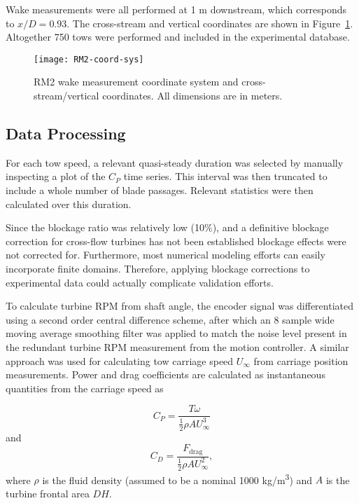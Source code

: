 Wake measurements were all performed at 1 m downstream, which corresponds to
$x/D = 0.93$. The cross-stream and vertical coordinates are shown in
Figure~\ref{fig:coordinates}. Altogether 750 tows were performed and included in
the experimental database.

\begin{figure}
    \centering

    \texttt{[image: RM2-coord-sys]}
    
    \caption{RM2 wake measurement coordinate system and cross-stream/vertical
        coordinates. All dimensions are in meters.}
    
    \label{fig:coordinates}
\end{figure}


\subsection{Data Processing}

For each tow speed, a relevant quasi-steady duration was selected by manually
inspecting a plot of the $C_P$ time series. This interval was then truncated to
include a whole number of blade passages. Relevant statistics were then
calculated over this duration.

Since the blockage ratio was relatively low (10\%), and a definitive blockage
correction for cross-flow turbines has not been established \cite{Cavagnaro2014}
blockage effects were not corrected for. Furthermore, most numerical modeling
efforts can easily incorporate finite domains. Therefore, applying blockage
corrections to experimental data could actually complicate validation efforts.

To calculate turbine RPM from shaft angle, the encoder signal was differentiated
using a second order central difference scheme, after which an 8 sample wide
moving average smoothing filter was applied to match the noise level present in
the redundant turbine RPM measurement from the motion controller. A similar
approach was used for calculating tow carriage speed $U_\infty$ from carriage
position measurements. Power and drag coefficients are calculated as
instantaneous quantities from the carriage speed as

\begin{equation}
    C_P = \frac{T \omega}{\frac{1}{2} \rho A U_\infty^3}
\end{equation}
and
\begin{equation}
    C_D = \frac{F_\mathrm{drag}}{\frac{1}{2} \rho A U_\infty^2},
\end{equation}
where $\rho$ is the fluid density (assumed to be a nominal 1000
kg/m\textsuperscript{3}) and $A$ is the turbine frontal area $DH$.

